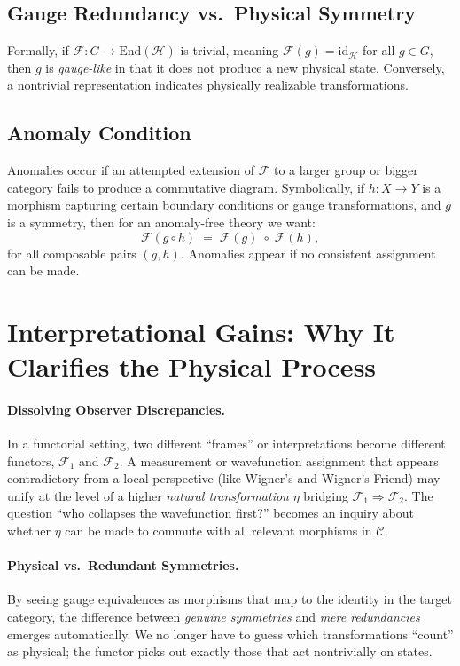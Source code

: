 \documentclass[12pt]{article}
\begin{document}
\subsection{Gauge Redundancy vs.\ Physical Symmetry}
Formally, if $\mathcal{F} : G \to \mathrm{End}(\mathcal{H})$ is trivial, meaning $\mathcal{F}(g) = \mathrm{id}_\mathcal{H}$ 
for all $g \in G$, then $g$ is \emph{gauge-like} in that it does not produce a new physical state. 
Conversely, a nontrivial representation indicates physically realizable transformations.

\subsection{Anomaly Condition}
Anomalies occur if an attempted extension of $\mathcal{F}$ to a larger group or bigger category fails 
to produce a commutative diagram. Symbolically, if $h : X \to Y$ is a morphism capturing certain boundary 
conditions or gauge transformations, and $g$ is a symmetry, then for an anomaly-free theory we want:
\[
\mathcal{F}(g \circ h) \;=\; \mathcal{F}(g) \;\circ\; \mathcal{F}(h),
\]
for all composable pairs $(g, h)$. Anomalies appear if no consistent assignment can be made. 

\section{Interpretational Gains: Why It Clarifies the Physical Process}
\label{sec:InterpretationalGains}

\paragraph{Dissolving Observer Discrepancies.}
In a functorial setting, two different “frames” or interpretations become different functors, $\mathcal{F}_1$ and $\mathcal{F}_2$. 
A measurement or wavefunction assignment that appears contradictory from a local perspective (like Wigner’s and Wigner’s Friend) 
may unify at the level of a higher \emph{natural transformation} $\eta$ bridging $\mathcal{F}_1 \Rightarrow \mathcal{F}_2$. 
The question “who collapses the wavefunction first?” becomes an inquiry about whether $\eta$ can be made to commute 
with all relevant morphisms in $\mathcal{C}$.

\paragraph{Physical vs.\ Redundant Symmetries.}
By seeing gauge equivalences as morphisms that map to the identity in the target category, the difference between 
\emph{genuine symmetries} and \emph{mere redundancies} emerges automatically. We no longer have to guess 
which transformations “count” as physical; the functor picks out exactly those that act nontrivially on states.
\end{document}
